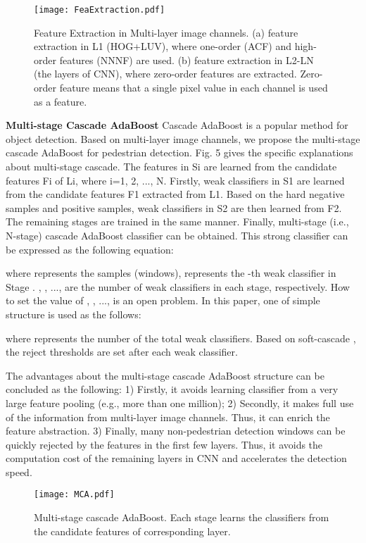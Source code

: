 \documentclass[journal]{IEEEtran}
\begin{document}
\begin{figure}[!t]
\label{FeaExtraction}
\centering
\texttt{[image: FeaExtraction.pdf]}
\caption{Feature Extraction in Multi-layer image channels. (a) feature extraction in L1 (HOG+LUV), where one-order (ACF) and high-order features (NNNF) are used. (b) feature extraction in L2-LN (the layers of CNN), where zero-order features are extracted. Zero-order feature means that a single pixel value in each channel is used as a feature. 
} 
\end{figure}

\textbf{Multi-stage Cascade AdaBoost} Cascade AdaBoost is a popular method for object detection. Based on multi-layer image channels, we propose the multi-stage cascade AdaBoost for pedestrian detection. Fig. 5 gives the specific explanations about multi-stage cascade. The features in Si are learned from the candidate features Fi  of Li, where i=1, 2, ..., N. Firstly,  weak classifiers in S1 are learned from the candidate features F1 extracted from L1. Based on the hard negative samples and positive samples,  weak classifiers in S2 are then learned from F2. The remaining stages are trained in the same manner. Finally, multi-stage (i.e., N-stage) cascade AdaBoost classifier can be obtained. This strong classifier  can be expressed as the following equation:

where  represents the samples (windows),  represents the -th weak classifier in Stage . , , ...,  are the number of weak classifiers in each stage, respectively. How to set the value of , , ...,   is an open problem. In this paper, one of simple structure is used  as the follows: 

where  represents the number of the total weak classifiers. Based on soft-cascade \cite{Bourdev_SoftCascade_CVPR_2005}, the reject thresholds are set after each weak classifier.

The advantages about the multi-stage cascade AdaBoost structure can be concluded as the following: 1) Firstly, it avoids learning classifier from a very large feature pooling (e.g., more than one million); 2) Secondly, it makes full use of the information from multi-layer image channels. Thus, it can enrich the feature abstraction. 3) Finally, many non-pedestrian detection windows can be quickly rejected by the features in the first few layers. Thus, it avoids the computation cost of the remaining layers in CNN and accelerates the detection speed.

\begin{figure}[!t]
\label{MCA}
\centering
\texttt{[image: MCA.pdf]}
\caption{Multi-stage cascade AdaBoost. Each stage learns the classifiers from the candidate features of corresponding layer.} 
\end{figure}
\end{document}
